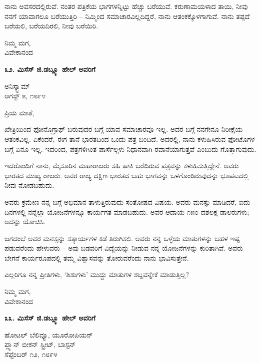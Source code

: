 ನಾನು ಅವಸರದಲ್ಲಿರುವೆ. ನಂತರ ಪತ್ರಿಕೆಯ ಭಾಗಗಳನ್ನಿಟ್ಟು ಹೆಚ್ಚು ಬರೆಯುವೆ. ಕರುಣಾಮಯಳಾದ ತಾಯಿ, ನೀವು ನನಗೆ ಯಾವಾಗಲೂ ಬರೆಯುತ್ತಿರಿ – ನಿಮ್ಮಿಂದ ಸಮಾಚಾರವಿಲ್ಲದಿದ್ದರೆ, ನಾನು ಆತಂಕಕ್ಕೊಳಗಾಗುವೆ. ನಾನು ತಪ್ಪದೆ ಬರೆಯಲಿ, ಬರೆಯದಿರಲಿ, ನೀವು ಬರೆಯಿರಿ.

\begin{flushright}
ನಿಮ್ಮ ಮಗ,\\ವಿವೇಕಾನಂದ
\end{flushright}

\begin{center}
\textbf{೩೨. ಮಿಸೆಸ್ ಜಿ.ಡಬ್ಲ್ಯೂ ಹೇಲ್ ಅವರಿಗೆ}
\end{center}

\begin{flushright}
ಅನಿಸ್ಕ್ವಾಮ್​\\ಆಗಸ್ಟ್ ೫, ೧೮೯೪
\end{flushright}

ಪ್ರಿಯ ಮಾತೆ,

ಖೇತ್ರಿಯಿಂದ ಫೋನೊಗ್ರಾಫ್ ಬರುವುದರ ಬಗ್ಗೆ ಯಾವ ಸಮಾಚಾರವೂ ಇಲ್ಲ. ಅದರ ಬಗ್ಗೆ ನನಗೇನೂ ನಿರೀಕ್ಷೆಯ ಆತಂಕವಿಲ್ಲ. ಏಕೆಂದರೆ, ಈಗ ತಾನೆ ಭಾರತದಿಂದ ಒಂದು ಪತ್ರ ಬಂದಿದೆ. ಅದರಲ್ಲಿ, ನಾನು ಕಳುಹಿಸಿರುವ ಫೋಟೊಗಳ ಬಗ್ಗೆ ಏನೂ ಇಲ್ಲ. ಇದರಿಂದ, ಪತ್ರಗಳಿಗಿಂತ ಪಾರ್ಸೆಲ್ಗಳು ನಿಧಾನವಾಗಿ ರವಾನೆಯಾಗುತ್ತವೆ ಎಂಬುದು ಗೊತ್ತಾಗುವುದು.

ಇದರೊಂದಿಗೆ ನಾನು, ಮೈಸೂರಿನ ಮಹಾರಾಜರು ಸಹಿ ಹಾಕಿ ಬರೆದಿರುವ ಪತ್ರವನ್ನು ಕಳುಹಿಸುತ್ತಿದ್ದೇನೆ. ಅವರು ಭಾರತದ ಮುಖ್ಯ ರಾಜರು. ಅವರ ರಾಜ್ಯ ದಕ್ಷಿಣ ಭಾರತದ ಬಹು ಭಾಗವನ್ನು ಒಳಗೊಂಡಿರುವುದನ್ನು ಭೂಪಟದಲ್ಲಿ ನೀವು ನೋಡಬಹುದು.

ಅವರು ಕ್ರಮೇಣ ನನ್ನ ಬಗ್ಗೆ ಅಭಿಮಾನ ತಾಳುತ್ತಿರುವುದು ಸಂತೋಷದ ವಿಷಯ. ಅವರು ಮನಸ್ಸು ಮಾಡಿದರೆ, ಐದು ದಿನಗಳಲ್ಲಿ ನನ್ನೆಲ್ಲಾ ಯೋಜನೆಗಳನ್ನೂ ಕಾರ್ಯಗತ ಮಾಡಬಹುದು. ಅವರ ಆದಾಯ ೧೫೦ ದಶಲಕ್ಷ ಡಾಲರುಗಳು; ಅದನ್ನು ಯೋಚಿಸಿ.

ಜಗದಂಬೆ ಅವರ ಮನಸ್ಸನ್ನು ಸತ್ಕಾರ್ಯಗಳ ಕಡೆ ತಿರುಗಿಸಲಿ. ಅವರು ನನ್ನ ಒಳ್ಳೆಯ ಮಾತುಗಳನ್ನು ಬಹಳ ಇಷ್ಟ ಪಡುವರೆಂದು ಹೇಳುವರು – ಅವು ಬಡವರಿಗೆ ವಿದ್ಯೆಯನ್ನು ನೀಡುವ ನನ್ನ ಯೋಜನೆಗಳನ್ನು ಕುರಿತಾಗಿವೆ. ಅವರು ಬೇಗನೆ ಕಾರ್ಯರೂಪದಲ್ಲಿ ತಮ್ಮ ವಿಶ್ವಾಸವನ್ನು ತೋರುವರೆಂದು ನಾನು ಭಾವಿಸುತ್ತೇನೆ.

ಎಲ್ಲರಿಗೂ ನನ್ನ ಪ್ರೀತಿಗಳು, ‘ಶಿಶುಗಳು’ ಮುದ್ದು ಮಾತುಗಳ ಶಬ್ದವನ್ನೇಕೆ ಮಾಡುತ್ತಿಲ್ಲ?

\begin{flushright}
ನಿಮ್ಮ ಮಗ,\\ವಿವೇಕಾನಂದ
\end{flushright}

\begin{center}
\textbf{೩೩. ಮಿಸೆಸ್ ಜಿ.ಡಬ್ಲ್ಯೂ ಹೇಲ್ ಅವರಿಗೆ}
\end{center}

\begin{flushright}
ಹೋಟಲ್ ಬೆಲಿವ್ಯೂ, ಯೂರೋಪಿಯನ್\\ಪ್ಲ್ಯಾನ್ ಬೀಕನ್ ಸ್ಟ್ರೀಟ್, ಬಾಸ್ಟನ್\\ಸೆಪ್ಟೆಂಬರ್ ೧೨, ೧೮೯೪
\end{flushright}

